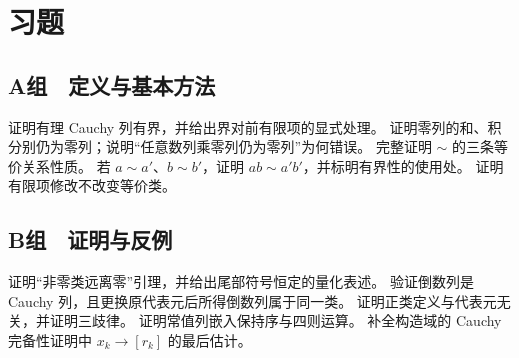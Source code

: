 \section*{习题}

\subsection*{A组　定义与基本方法}
\begin{enumerate}[label=\textbf{\thechapter.\arabic*.}]
  证明有理 Cauchy 列有界，并给出界对前有限项的显式处理。
  证明零列的和、积分别仍为零列；说明“任意数列乘零列仍为零列”为何错误。
  完整证明 \(\sim\) 的三条等价关系性质。
  若 \(a\sim a'\)、\(b\sim b'\)，证明 \(ab\sim a'b'\)，并标明有界性的使用处。
  证明有限项修改不改变等价类。
\end{enumerate}

\subsection*{B组　证明与反例}
\begin{enumerate}[label=\textbf{\thechapter.\arabic*.},resume]
  证明“非零类远离零”引理，并给出尾部符号恒定的量化表述。
  验证倒数列是 Cauchy 列，且更换原代表元后所得倒数列属于同一类。
  证明正类定义与代表元无关，并证明三歧律。
  证明常值列嵌入保持序与四则运算。
  补全构造域的 Cauchy 完备性证明中 \(x_k\to[r_k]\) 的最后估计。
\end{enumerate}

